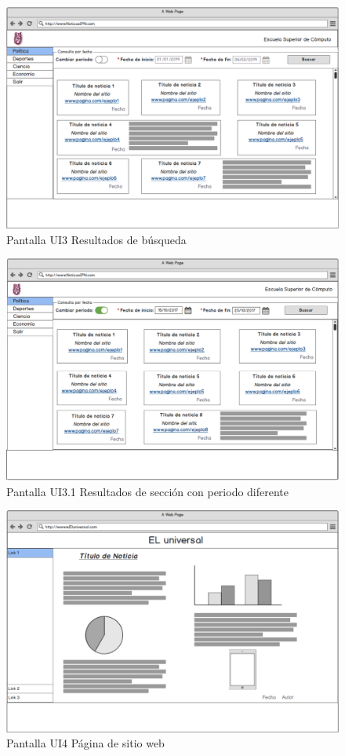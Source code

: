 \begin{figure}[h]
  \centering
	\includegraphics[scale=.35]{imagenes/Pantallas/UI3}
  \caption{Pantalla UI3 Resultados de búsqueda}
  \label{fig:UI3}
\end{figure}


\begin{figure}[h]
  \centering
  \includegraphics[scale=.35]{imagenes/Pantallas/UI3_1}
  \caption{Pantalla UI3.1 Resultados de sección con periodo diferente}
  \label{fig:UI3_1}
\end{figure}


\begin{figure}[h]
  \centering
	\includegraphics[scale=.35]{imagenes/Pantallas/UI4}
  \caption{Pantalla UI4 Página de sitio web}
  \label{fig:UI4}
\end{figure}
